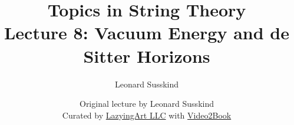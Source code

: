 \documentclass[11pt,oneside]{book}
\begin{document}
\frontmatter
\title{Topics in String Theory\\[0.45em]\large Lecture 8: Vacuum Energy and de Sitter Horizons}
\author{Leonard Susskind}
\date{Original lecture by Leonard Susskind\\[0.35em]Curated by \href{https://lazying.art}{LazyingArt LLC} with \href{https://github.com/lachlanchen/Video2Book}{Video2Book}}
\maketitle
\mainmatter

\end{document}
